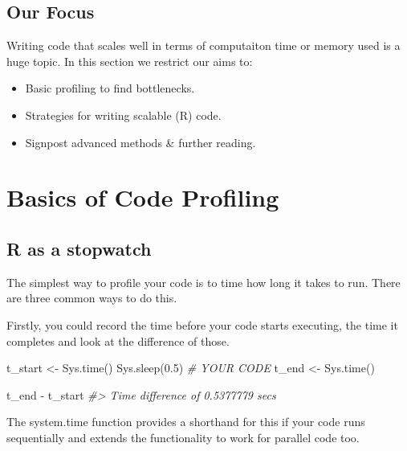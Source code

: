 \documentclass[
  12pt,
]{book}
\newenvironment{Shaded}{\begin{snugshade}}{\end{snugshade}}
\newcommand{\CommentTok}[1]{\textcolor[rgb]{0.56,0.35,0.01}{\textit{#1}}}
\newcommand{\FloatTok}[1]{\textcolor[rgb]{0.00,0.00,0.81}{#1}}
\newcommand{\FunctionTok}[1]{\textcolor[rgb]{0.00,0.00,0.00}{#1}}
\newcommand{\NormalTok}[1]{#1}
\newcommand{\OtherTok}[1]{\textcolor[rgb]{0.56,0.35,0.01}{#1}}
\newcommand{\SpecialCharTok}[1]{\textcolor[rgb]{0.00,0.00,0.00}{#1}}
\providecommand{\tightlist}{%
  \setlength{\itemsep}{0pt}\setlength{\parskip}{0pt}}
\begin{document}
\hypertarget{our-focus}{%
\subsection{Our Focus}\label{our-focus}}

Writing code that scales well in terms of computaiton time or memory used is a huge topic. In this section we restrict our aims to:

\begin{itemize}
\tightlist
\item
  Basic profiling to find bottlenecks.
\item
  Strategies for writing scalable (R) code.
\item
  Signpost advanced methods \& further reading.
\end{itemize}

\hypertarget{basics-of-code-profiling}{%
\section{Basics of Code Profiling}\label{basics-of-code-profiling}}

\hypertarget{r-as-a-stopwatch}{%
\subsection{R as a stopwatch}\label{r-as-a-stopwatch}}

The simplest way to profile your code is to time how long it takes to run. There are three common ways to do this.

Firstly, you could record the time before your code starts executing, the time it completes and look at the difference of those.

\begin{Shaded}
\begin{Highlighting}[]
\NormalTok{t\_start }\OtherTok{\textless{}{-}} \FunctionTok{Sys.time}\NormalTok{()}
\FunctionTok{Sys.sleep}\NormalTok{(}\FloatTok{0.5}\NormalTok{) }\CommentTok{\# YOUR CODE}
\NormalTok{t\_end }\OtherTok{\textless{}{-}} \FunctionTok{Sys.time}\NormalTok{()}

\NormalTok{t\_end }\SpecialCharTok{{-}}\NormalTok{ t\_start}
\CommentTok{\#\textgreater{} Time difference of 0.5377779 secs}
\end{Highlighting}
\end{Shaded}

The system.time function provides a shorthand for this if your code runs sequentially and extends the functionality to work for parallel code too.
\end{document}
